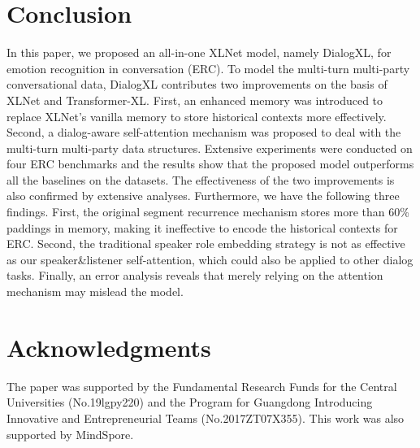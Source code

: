 \documentclass[letterpaper]{article} \usepackage{aaai21}  \usepackage{times}  \usepackage{helvet} \usepackage{courier}  \usepackage[hyphens]{url}  \usepackage{graphicx} \usepackage{amstext}
\begin{document}
\section{Conclusion}
In this paper, we proposed an all-in-one XLNet model, namely DialogXL, for emotion recognition in conversation (ERC). To model the multi-turn multi-party conversational data, DialogXL contributes two improvements on the basis of XLNet and Transformer-XL. First, an enhanced memory was introduced to replace XLNet's vanilla memory to store historical contexts more effectively. Second, a dialog-aware self-attention mechanism was proposed to deal with the multi-turn multi-party data structures. Extensive experiments were conducted on four ERC benchmarks and the results show that the proposed model outperforms all the baselines on the datasets. The effectiveness of the two improvements is also confirmed by extensive analyses. Furthermore, we have the following three findings. First, the original segment recurrence mechanism stores more than 60\% paddings in memory, making it ineffective to encode the historical contexts for ERC. Second, the traditional speaker role embedding strategy is not as effective as our speaker\&listener self-attention, which could also be applied to other dialog tasks. Finally, an error analysis reveals that merely relying on the attention mechanism may mislead the model.

\section{Acknowledgments}
The paper was supported by the Fundamental Research Funds for the Central Universities (No.19lgpy220) and the Program for Guangdong Introducing Innovative and Entrepreneurial Teams (No.2017ZT07X355). This work was also supported by MindSpore.


\end{document}
